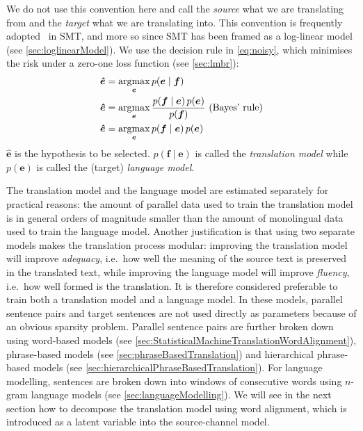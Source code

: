 We do not use this convention here and call the
\emph{source} what we are translating from and the \emph{target} what we are
translating into. This convention is frequently
adopted~\citep{och-tillmann-ney:1999:EMNLP,och-ney:2002:ACL,och-ney:2004:CL}
in SMT,
and more so since SMT has been framed as a log-linear
model (see \autoref{sec:loglinearModel}). We use the
decision rule in \autoref{eq:noisy}, which minimises the risk under
a zero-one loss function (see \autoref{sec:lmbr}):
%
\begin{align}
  \bm{\hat{e}} &= \operatorname*{argmax}_{\bm{e}} p(\bm{e} \mid \bm{f}) \nonumber \\
  \bm{\hat{e}} &= \operatorname*{argmax}_{\bm{e}} \frac{p(\bm{f} \mid \bm{e}) \, p(\bm{e})}{p(\bm{f})} \mbox{ (Bayes' rule)} \nonumber \\
  \bm{\hat{e}} &= \operatorname*{argmax}_{\bm{e}} p(\bm{f} \mid \bm{e}) \, p(\bm{e}) \label{eq:noisy}
\end{align}
%
$\bm{\hat{e}}$ is the hypothesis to be selected.
$p(\bm{f} \mid \bm{e})$ is called the \emph{translation model} while
$p(\bm{e})$ is called the (target) \emph{language model}.

The translation model and the language model are estimated separately
for practical reasons: the amount of parallel data used to train the translation
model is in general orders of magnitude smaller than the amount of monolingual
data used to train the language model. Another justification is that
using two separate models makes the translation process modular: improving
the translation model will improve \emph{adequacy}, i.e.\ how well the meaning
of the source text is preserved in the translated text, while improving
the language model will improve \emph{fluency}, i.e.\ how well formed is the
translation. It is therefore considered
preferable to train both a translation model and a language model.
In these models, parallel sentence pairs and target sentences are
not used directly as parameters because of an obvious sparsity
problem. Parallel sentence pairs are further broken down using
word-based models (see \autoref{sec:StatisticalMachineTranslationWordAlignment}),
phrase-based models (see \autoref{sec:phraseBasedTranslation})
and hierarchical phrase-based models
(see \autoref{sec:hierarchicalPhraseBasedTranslation}). For language
modelling, sentences are broken down into windows of consecutive
words using $n$-gram language models (see \autoref{sec:languageModelling}).
We will see in the next section how to decompose
the translation model using word alignment, which is
introduced as a latent variable into the source-channel model.

